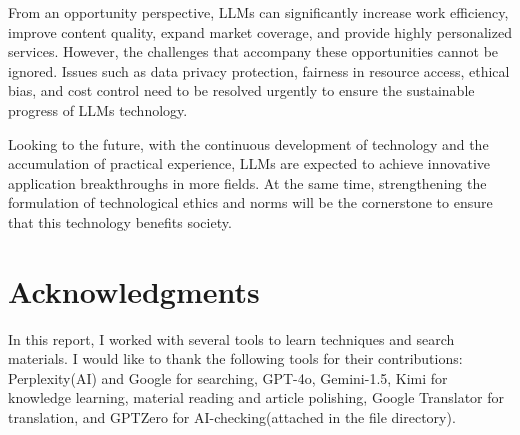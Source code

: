 \documentclass[fleqn,10pt]{SelfArx} %
\begin{document}
From an opportunity perspective, LLMs can significantly increase work efficiency, improve content quality, expand market coverage, and provide highly personalized services. However, the challenges that accompany these opportunities cannot be ignored. Issues such as data privacy protection, fairness in resource access, ethical bias, and cost control need to be resolved urgently to ensure the sustainable progress of LLMs technology.

Looking to the future, with the continuous development of technology and the accumulation of practical experience, LLMs are expected to achieve innovative application breakthroughs in more fields. At the same time, strengthening the formulation of technological ethics and norms will be the cornerstone to ensure that this technology benefits society.

\section*{Acknowledgments} %

In this report, I worked with several tools to learn techniques and search materials. I would like to thank the following tools for their contributions: Perplexity(AI) and Google for searching, GPT-4o, Gemini-1.5, Kimi for knowledge learning, material reading and article polishing, Google Translator for translation, and GPTZero for AI-checking(attached in the file directory).







\end{document}
